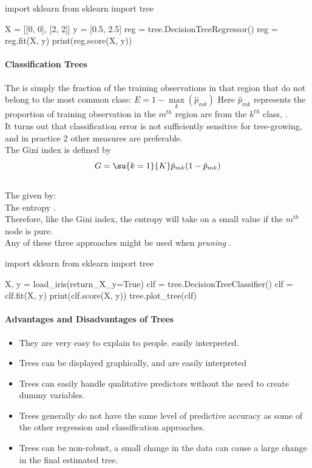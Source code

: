 \begin{python}
import sklearn
from sklearn import tree

X = [[0, 0], [2, 2]] 
y = [0.5, 2.5]
reg = tree.DecisionTreeRegressor()
reg = reg.fit(X, y) 
print(reg.score(X, y))
\end{python}

\paragraph{Classification Trees}
The  is simply the fraction of the training
observations in that region that do not belong to the most common 
class:
$E=1-\max\limits_{k}(\hat{p}_{mk})$
Here $\hat{p}_{mk}$ represents the proportion of training 
observation in the $m^{th}$ region are from the $k^{th}$ class, .\\
It turns out that classification error is not sufficiently sensitive 
for tree-growing, and in practice 2 other measures are preferable.\\
The Gini index is defined by
$$
G=\su{{k=1}}{K}\hat{p}_{mk}(1-\hat{p}_{mk})
$$\\
The  given by:
\\
The entropy .\\ Therefore, like the Gini index, the 
entropy will take on a small value if the $m^{th}$ node is pure.\\

Any of these three approaches might be used when \emph{pruning} .

\begin{python}
import sklearn
from sklearn import tree

X, y = load_iris(return_X_y=True)
clf = tree.DecisionTreeClassifier()
clf = clf.fit(X, y) 
print(clf.score(X, y))
tree.plot_tree(clf)
\end{python}
\paragraph{Advantages and Disadvantages of Trees}
\begin{itemize}
	\item[\tV{+}] They are very easy to explain to people.
		easily interpreted.
	\item[\tV{+}] Trees can be displayed graphically, and are 
		easily interpreted
	\item[\tV{+}] Trees can easily handle qualitative predictors 
		without the need to create dummy variables.
	\item[\tR{-}] Trees generally do not have the same level of
		predictive accuracy as some of the other regression
		and classification approaches.
	\item[\tR{-}] Trees can be non-robust, a small change in the 
		data can cause a large change in the final estimated
		tree.
\end{itemize}


